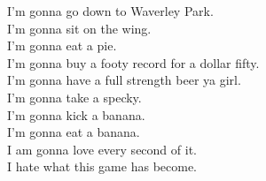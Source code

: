 I'm gonna go down to Waverley Park. \\
I'm gonna sit on the wing. \\
I'm gonna eat a pie. \\
I'm gonna buy a footy record for a dollar fifty. \\
I'm gonna have a full strength beer ya girl. \\
I'm gonna take a specky. \\
I'm gonna kick a banana. \\
I'm gonna eat a banana. \\
I am gonna love every second of it. \\
I hate what this game has become. \\
